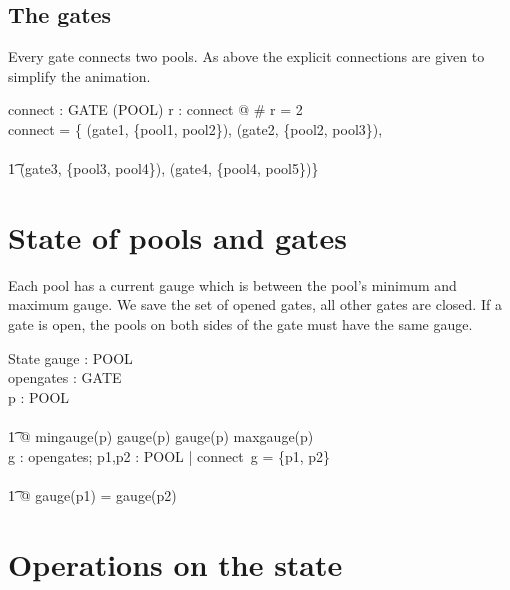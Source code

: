 \documentclass[a4paper]{article}
\begin{document}
\subsection{The gates}
Every gate connects two pools. As above the explicit connections are
given to simplify the animation.

\begin{axdef}
  connect : GATE \fun (\power POOL)
  \where
  \forall r : \ran connect @ \# r = 2\\
  connect = \{
  (gate1, \{pool1, pool2\}),
  (gate2, \{pool2, pool3\}),\\\\
  \t1 (gate3, \{pool3, pool4\}),
  (gate4, \{pool4, pool5\})\}
\end{axdef}

\section{State of pools and gates}
Each pool has a current gauge which is between the pool's minimum and maximum
gauge. We save the set of opened gates, all other gates are closed. If a gate
is open, the pools on both sides of the gate must have the same gauge.

\begin{schema}{State}
  gauge : POOL \fun \nat\\
  opengates : \power GATE\\
  \where
  \forall p : POOL \\\\
  \t1 @ mingauge(p) \leq gauge(p) \land gauge(p) \leq maxgauge(p)\\
  \forall g : opengates; p1,p2 : POOL | connect~g = \{p1, p2\} \\\\
  \t1 @ gauge(p1) = gauge(p2)\\
\end{schema}

\section{Operations on the state}
\end{document}
